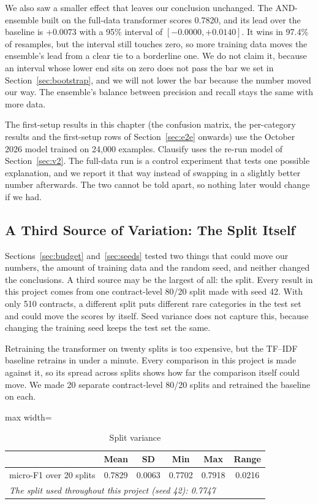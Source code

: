 We also saw a smaller effect that leaves our conclusion unchanged. The AND-ensemble built on the full-data transformer scores 0.7820, and its lead over the baseline is $+0.0073$ with a 95\% interval of $[-0.0000, +0.0140]$. It wins in 97.4\% of resamples, but the interval still touches zero, so more training data moves the ensemble's lead from a clear tie to a borderline one. We do not claim it, because an interval whose lower end sits on zero does not pass the bar we set in Section~\ref{sec:bootstrap}, and we will not lower the bar because the number moved our way. The ensemble's balance between precision and recall stays the same with more data.

The first-setup results in this chapter (the confusion matrix, the per-category results and the first-setup rows of Section~\ref{sec:e2e} onwards) use the October 2026 model trained on 24{,}000 examples. Clausify uses the re-run model of Section~\ref{sec:v2}. The full-data run is a control experiment that tests one possible explanation, and we report it that way instead of swapping in a slightly better number afterwards. The two cannot be told apart, so nothing later would change if we had.
\subsection{A Third Source of Variation: The Split Itself}
\label{sec:splitvar}
Sections~\ref{sec:budget} and~\ref{sec:seeds} tested two things that could move our numbers, the amount of training data and the random seed, and neither changed the conclusions. A third source may be the largest of all: the split. Every result in this project comes from one contract-level 80/20 split made with seed 42. With only 510 contracts, a different split puts different rare categories in the test set and could move the scores by itself. Seed variance does not capture this, because changing the training seed keeps the test set the same.

Retraining the transformer on twenty splits is too expensive, but the TF--IDF baseline retrains in under a minute. Every comparison in this project is made against it, so its spread across splits shows how far the comparison itself could move. We made 20 separate contract-level 80/20 splits and retrained the baseline on each.

\begin{table}[!htbp]
\centering
\caption{Split variance}
\label{tab:splitvar}
\small
\begin{adjustbox}{max width=\textwidth}
\begin{tabular}{lccccc}
\toprule
 & \textbf{Mean} & \textbf{SD} & \textbf{Min} & \textbf{Max} & \textbf{Range}\\
\midrule
micro-F1 over 20 splits & 0.7829 & 0.0063 & 0.7702 & 0.7918 & 0.0216\\
\midrule
\multicolumn{6}{l}{\emph{The split used throughout this project (seed 42): 0.7747}}\\
\bottomrule
\end{tabular}
\end{adjustbox}
\end{table}

